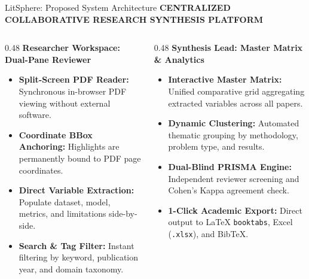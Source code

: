 \documentclass[aspectratio=169,10pt]{beamer}
\begin{document}
\begin{frame}{LitSphere: Proposed System Architecture}
\vspace{-0.15cm}
\centering
{\fontsize{8pt}{10pt}\selectfont\bfseries\color{SubText} CENTRALIZED COLLABORATIVE RESEARCH SYNTHESIS PLATFORM}\par\vspace{0.25cm}

\begin{columns}[T]
  \begin{column}{0.48\textwidth}
    {\fontsize{9.5pt}{11.5pt}\selectfont\bfseries\color{DarkText} Researcher Workspace: Dual-Pane Reviewer}\par\vspace{4pt}
    {\fontsize{7.5pt}{10pt}\selectfont\color{DarkText}
    \begin{itemize}
      \item \textbf{Split-Screen PDF Reader:} Synchronous in-browser PDF viewing without external software.
      \item \textbf{Coordinate BBox Anchoring:} Highlights are permanently bound to PDF page coordinates.
      \item \textbf{Direct Variable Extraction:} Populate dataset, model, metrics, and limitations side-by-side.
      \item \textbf{Search \& Tag Filter:} Instant filtering by keyword, publication year, and domain taxonomy.
    \end{itemize}}
  \end{column}

  \begin{column}{0.48\textwidth}
    {\fontsize{9.5pt}{11.5pt}\selectfont\bfseries\color{DarkText} Synthesis Lead: Master Matrix \& Analytics}\par\vspace{4pt}
    {\fontsize{7.5pt}{10pt}\selectfont\color{DarkText}
    \begin{itemize}
      \item \textbf{Interactive Master Matrix:} Unified comparative grid aggregating extracted variables across all papers.
      \item \textbf{Dynamic Clustering:} Automated thematic grouping by methodology, problem type, and results.
      \item \textbf{Dual-Blind PRISMA Engine:} Independent reviewer screening and Cohen's Kappa agreement check.
      \item \textbf{1-Click Academic Export:} Direct output to LaTeX \texttt{booktabs}, Excel (\texttt{.xlsx}), and BibTeX.
    \end{itemize}}
  \end{column}
\end{columns}


\end{frame}
\end{document}

